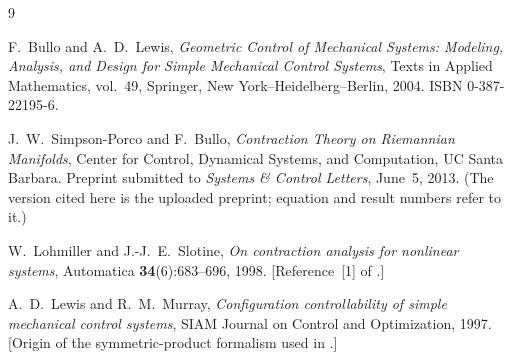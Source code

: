 \documentclass[11pt,a4paper]{article}
\theoremstyle{plain}
\theoremstyle{definition}
\theoremstyle{remark}
\begin{document}
\begin{thebibliography}{9}

F.~Bullo and A.~D.~Lewis,
\emph{Geometric Control of Mechanical Systems: Modeling, Analysis, and Design for
Simple Mechanical Control Systems}, Texts in Applied Mathematics, vol.~49,
Springer, New York--Heidelberg--Berlin, 2004. ISBN 0-387-22195-6.

J.~W.~Simpson-Porco and F.~Bullo,
\emph{Contraction Theory on Riemannian Manifolds}, Center for Control, Dynamical
Systems, and Computation, UC Santa Barbara. Preprint submitted to
\emph{Systems \& Control Letters}, June~5, 2013. (The version cited here is the
uploaded preprint; equation and result numbers refer to it.)

W.~Lohmiller and J.-J.~E.~Slotine,
\emph{On contraction analysis for nonlinear systems},
Automatica \textbf{34}(6):683--696, 1998.
[Reference~{[1]} of \cite{SB13}.]

A.~D.~Lewis and R.~M.~Murray,
\emph{Configuration controllability of simple mechanical control systems},
SIAM Journal on Control and Optimization, 1997.
[Origin of the symmetric-product formalism used in \cite[Ch.~7--8]{BL04}.]

\end{thebibliography}
\end{document}
